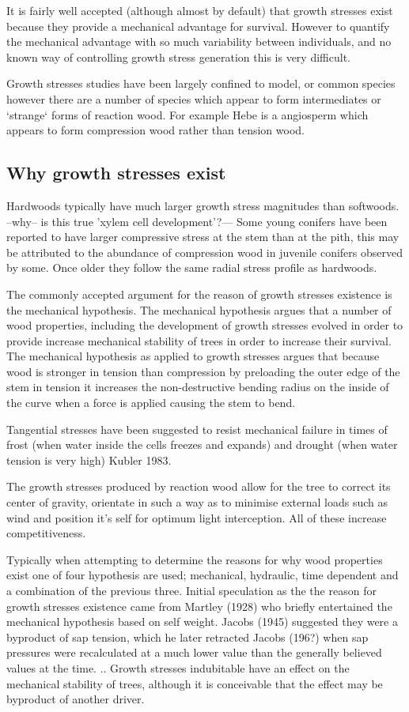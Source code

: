 \documentclass{article}
\begin{document}
It is fairly well accepted (although almost by default) that growth stresses
exist because they provide a mechanical advantage for survival. However to
quantify the mechanical advantage with so much variability between individuals,
and no known way of controlling growth stress generation this is very difficult.

Growth stresses studies have been largely confined to model, or common species
however there are a number of species which appear to form intermediates or
`strange` forms of reaction wood. For example Hebe is a angiosperm which appears
to form compression wood rather than tension wood.

\subsection{Why growth stresses exist}
Hardwoods typically have much larger growth stress magnitudes than softwoods.
--why-- is this true 'xylem cell development'?--- Some young conifers have been
reported to have larger compressive stress at the stem than at the pith,
this may be attributed to the abundance of compression wood in juvenile
conifers observed by some. Once older they follow the same radial stress profile
as hardwoods.

The commonly accepted argument for the reason of growth stresses existence is
the mechanical hypothesis. The mechanical hypothesis argues that a number of wood
properties, including the development of growth stresses evolved in order to
provide increase mechanical stability of trees in order to increase their
survival. The mechanical hypothesis as applied to growth stresses argues that
because wood is stronger in tension than compression by preloading the outer
edge of the stem in tension it increases the non-destructive bending radius on
the inside of the curve when a force is applied causing the stem to bend.

Tangential stresses have been suggested to resist mechanical failure in times of
frost (when water inside the cells freezes and expands) and drought (when water
tension is very high) Kubler 1983.

The growth stresses produced by reaction wood allow for the tree to correct its
center of gravity, orientate in such a way as to minimise external loads such as
wind and position it's self for optimum light interception. All of these
increase competitiveness.

Typically when attempting to determine the reasons for why wood properties exist
one of four hypothesis are used; mechanical, hydraulic, time dependent and a
combination of the previous three. Initial speculation as the the reason for
growth stresses existence came from Martley (1928) who briefly entertained the
mechanical hypothesis based on self weight. Jacobs (1945) suggested they were a
byproduct of sap tension, which he later retracted Jacobs (196?) when sap
pressures were recalculated at a much lower value than the generally believed
values at the time. .. Growth stresses indubitable have an effect on the
mechanical stability of trees, although it is conceivable that the effect may be
byproduct of another driver.
\end{document}
